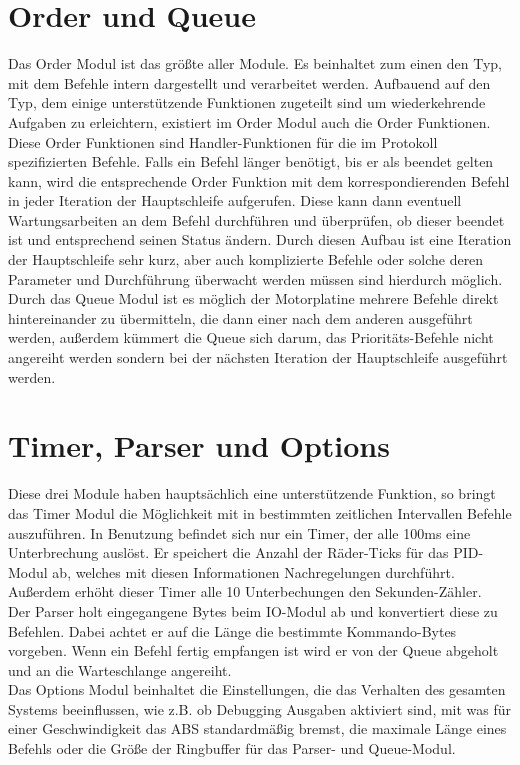 \section{Order und Queue}
Das Order Modul ist das größte aller Module. Es beinhaltet zum einen den Typ, mit dem Befehle
intern dargestellt und verarbeitet werden. Aufbauend auf den Typ, dem einige unterstützende
Funktionen zugeteilt sind um wiederkehrende Aufgaben zu erleichtern, existiert im Order
Modul auch die Order Funktionen. Diese Order Funktionen sind Handler-Funktionen für die
im Protokoll spezifizierten Befehle. Falls ein Befehl länger benötigt, bis er als beendet
gelten kann, wird die entsprechende Order Funktion mit dem korrespondierenden Befehl in jeder
Iteration der Hauptschleife aufgerufen. Diese kann dann eventuell Wartungsarbeiten an dem
Befehl durchführen und überprüfen, ob dieser beendet ist und entsprechend seinen Status ändern.
Durch diesen Aufbau ist eine Iteration der Hauptschleife sehr kurz, aber auch komplizierte Befehle
oder solche deren Parameter und Durchführung überwacht werden müssen sind hierdurch möglich.\\
Durch das Queue Modul ist es möglich der Motorplatine mehrere Befehle direkt hintereinander
zu übermitteln, die dann einer nach dem anderen ausgeführt werden, außerdem kümmert die
Queue sich darum, das Prioritäts-Befehle nicht angereiht werden sondern bei der nächsten
Iteration der Hauptschleife ausgeführt werden.
\section{Timer, Parser und Options}
Diese drei Module haben hauptsächlich eine unterstützende Funktion, so bringt das Timer Modul
die Möglichkeit mit in bestimmten zeitlichen Intervallen Befehle auszuführen. In Benutzung
befindet sich nur ein Timer, der alle 100ms eine Unterbrechung auslöst. Er speichert die Anzahl
der Räder-Ticks für das PID-Modul ab, welches mit diesen Informationen Nachregelungen durchführt.
Außerdem erhöht dieser Timer alle 10 Unterbechungen den Sekunden-Zähler.\\
Der Parser holt eingegangene Bytes beim IO-Modul ab und konvertiert diese zu Befehlen. Dabei
achtet er auf die Länge die bestimmte Kommando-Bytes vorgeben. Wenn ein Befehl fertig empfangen ist
wird er von der Queue abgeholt und an die Warteschlange angereiht.\\
Das Options
Modul beinhaltet die Einstellungen, die das Verhalten des gesamten Systems beeinflussen, wie
z.B. ob Debugging Ausgaben aktiviert sind, mit was für einer Geschwindigkeit das ABS standardmäßig bremst,
die maximale Länge eines Befehls oder die Größe der Ringbuffer für das Parser- und Queue-Modul.
